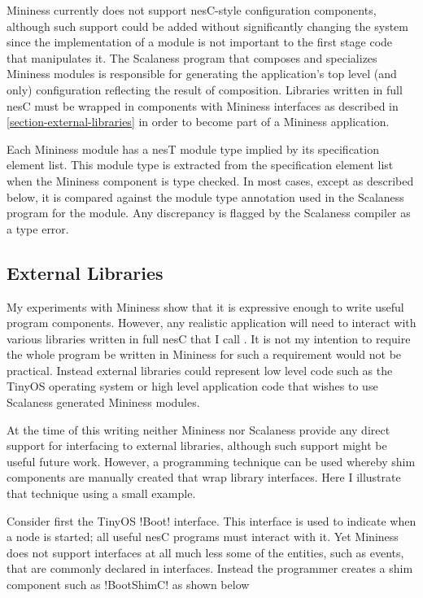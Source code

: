 Mininess currently does not support nesC-style configuration components, although such support
could be added without significantly changing the system since the implementation of a module is
not important to the first stage code that manipulates it. The Scalaness program that composes
and specializes Mininess modules is responsible for generating the application's top level (and
only) configuration reflecting the result of composition. Libraries written in full nesC must be
wrapped in components with Mininess interfaces as described in
\autoref{section-external-libraries} in order to become part of a Mininess application.

Each Mininess module has a nesT module type implied by its specification element list. This
module type is extracted from the specification element list when the Mininess component is type
checked. In most cases, except as described below, it is compared against the module type
annotation used in the Scalaness program for the module. Any discrepancy is flagged by the
Scalaness compiler as a type error.

\subsection{External Libraries}
\label{section-external-libraries}

My experiments with Mininess show that it is expressive enough to write useful program
components. However, any realistic application will need to interact with various libraries
written in full nesC that I call . It is not my intention to require
the whole program be written in Mininess for such a requirement would not be practical. Instead
external libraries could represent low level code such as the TinyOS operating system or high
level application code that wishes to use Scalaness generated Mininess modules.

At the time of this writing neither Mininess nor Scalaness provide any direct support for
interfacing to external libraries, although such support might be useful future work. However, a
programming technique can be used whereby shim components are manually created that wrap library
interfaces. Here I illustrate that technique using a small example.

Consider first the TinyOS !Boot! interface. This interface is used to indicate when a node is
started; all useful nesC programs must interact with it. Yet Mininess does not support
interfaces at all much less some of the entities, such as events, that are commonly declared in
interfaces. Instead the programmer creates a shim component such as !BootShimC! as shown below

